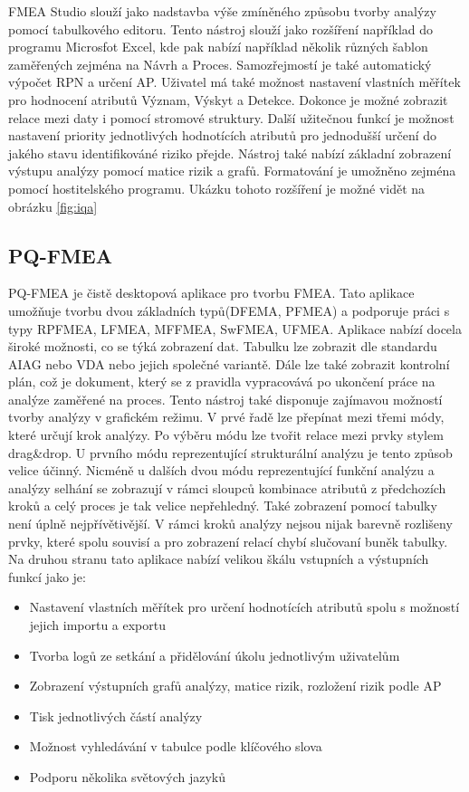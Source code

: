 FMEA Studio slouží jako nadstavba výše zmíněného způsobu tvorby analýzy pomocí tabulkového editoru. Tento nástroj slouží jako rozšíření například do programu Microsfot Excel, kde pak nabízí například několik různých šablon zaměřených zejména na Návrh a Proces. Samozřejmostí je také automatický výpočet RPN a určení AP. Uživatel má také možnost nastavení vlastních měřítek pro hodnocení atributů Význam, Výskyt a Detekce. Dokonce je možné zobrazit relace mezi daty i pomocí stromové struktury. Další užitečnou funkcí je možnost nastavení priority jednotlivých hodnotících atributů pro jednodušší určení do jakého stavu identifikováné riziko přejde. Nástroj také nabízí základní zobrazení výstupu analýzy pomocí matice rizik a grafů. Formatování je umožněno zejména pomocí hostitelského programu. Ukázku tohoto rozšíření je možné vidět na obrázku \ref{fig:iqa}
\break
\break


\subsection{PQ-FMEA}
PQ-FMEA je čistě desktopová aplikace pro tvorbu FMEA. Tato aplikace umožňuje tvorbu dvou základních typů(DFEMA, PFMEA) a podporuje práci s typy RPFMEA, LFMEA, MFFMEA, SwFMEA, UFMEA. Aplikace nabízí docela široké možnosti, co se týká zobrazení dat. Tabulku lze zobrazit dle standardu AIAG nebo VDA nebo jejich společné variantě. Dále lze také zobrazit kontrolní plán, což je dokument, který se z pravidla vypracovává po ukončení práce na analýze zaměřené na proces. Tento nástroj také disponuje zajímavou možností tvorby analýzy v grafickém režimu. V prvé řadě lze přepínat mezi třemi módy, které určují krok analýzy. Po výběru módu lze tvořit relace mezi prvky stylem drag\&drop. U prvního módu reprezentující strukturální analýzu je tento způsob velice účinný. Nicméně u dalších dvou módu reprezentující funkční analýzu a analýzy selhání se zobrazují v rámci sloupců kombinace atributů z předchozích kroků a celý proces je tak velice nepřehledný. Také zobrazení pomocí tabulky není úplně nejpřívětivější. V rámci kroků analýzy nejsou nijak barevně rozlišeny prvky, které spolu souvisí a pro zobrazení relací chybí slučovaní buněk tabulky. Na druhou stranu tato aplikace nabízí velikou škálu vstupních a výstupních funkcí jako je:
\begin{itemize}
    \item Nastavení vlastních měřítek pro určení hodnotících atributů spolu s možností jejich importu a exportu
    \item Tvorba logů ze setkání a přidělování úkolu jednotlivým uživatelům
    \item Zobrazení výstupních grafů analýzy, matice rizik, rozložení rizik podle AP 
    \item Tisk jednotlivých částí analýzy
    \item Možnost vyhledávání v tabulce podle klíčového slova
    \item Podporu několika světových jazyků
\end{itemize}

